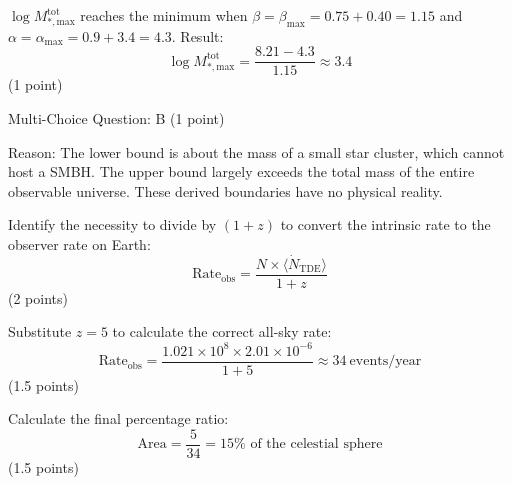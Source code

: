 \begin{description}
  $\log M_{*,\mathrm{max}}^{\mathrm{tot}}$ reaches the minimum when
  $\beta = \beta_{\mathrm{max}} = 0.75 + 0.40 = 1.15$ and
  $\alpha = \alpha_{\mathrm{max}} = 0.9 + 3.4 = 4.3$. Result:
  \[
  \log M_{*,\mathrm{max}}^{\mathrm{tot}} = \frac{8.21 - 4.3}{1.15} \approx 3.4
  \]
  \hfill(1 point)

  Multi-Choice Question: B \hfill(1 point)

  Reason: The lower bound is about the mass of a small star cluster, which
  cannot host a SMBH. The upper bound largely exceeds the total mass of the
  entire observable universe. These derived boundaries have no physical
  reality.

\item[(c)] Identify the necessity to divide by $(1+z)$ to convert the
  intrinsic rate to the observer rate on Earth:
  \[
  \mathrm{Rate}_{\mathrm{obs}}
    = \frac{N \times \langle \dot{N}_{\mathrm{TDE}} \rangle}{1 + z}
  \]
  \hfill(2 points)

  Substitute $z = 5$ to calculate the correct all-sky rate:
  \[
  \mathrm{Rate}_{\mathrm{obs}}
    = \frac{1.021 \times 10^8 \times 2.01 \times 10^{-6}}{1 + 5}
    \approx 34\ \mathrm{events/year}
  \]
  \hfill(1.5 points)

  Calculate the final percentage ratio:
  \[
  \mathrm{Area} = \frac{5}{34} = 15\% \text{ of the celestial sphere}
  \]
  \hfill(1.5 points)
\end{description}


